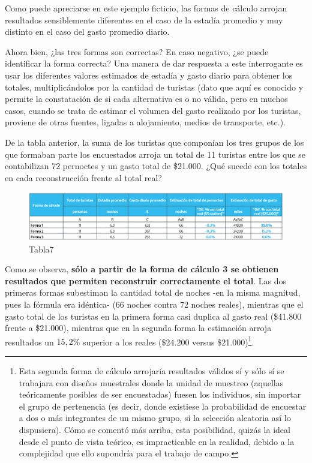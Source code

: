 \documentclass[
]{book}
\begin{document}
Como puede apreciarse en este ejemplo ficticio, las formas de cálculo arrojan resultados sensiblemente diferentes en el caso de la estadía promedio y muy distinto en el caso del gasto promedio diario.

Ahora bien, ¿las tres formas son correctas? En caso negativo, ¿se puede identificar la forma correcta? Una manera de dar respuesta a este interrogante es usar los diferentes valores estimados de estadía y gasto diario para obtener los totales, multiplicándolos por la cantidad de turistas (dato que aquí es conocido y permite la constatación de si cada alternativa es o no válida, pero en muchos casos, cuando se trata de estimar el volumen del gasto realizado por los turistas, proviene de otras fuentes, ligadas a alojamiento, medios de transporte, etc.).

De la tabla anterior, la suma de los turistas que componían los tres grupos de los que formaban parte los encuestados arroja un total de 11 turistas entre los que se contabilizan 72 pernoctes y un gasto total de \$21.000. ¿Qué sucede con los totales en cada reconstrucción frente al total real?

\begin{figure}
\includegraphics[width=1\linewidth]{imagenes/tabla_7} \caption{Tabla7}\label{fig:Totalreal}
\end{figure}

Como se observa, \textbf{sólo a partir de la forma de cálculo 3 se obtienen resultados que permiten reconstruir correctamente el total}. Las dos primeras formas subestiman la cantidad total de noches -en la misma magnitud, pues la fórmula era idéntica- (66 noches contra 72 noches reales), mientras que el gasto total de los turistas en la primera forma casi duplica al gasto real (\$41.800 frente a \$21.000), mientras que en la segunda forma la estimación arroja resultados un \(15,2\%\) superior a los reales (\$24.200 versus \$21.000)\footnote{Esta segunda forma de cálculo arrojaría resultados válidos sí y sólo sí se trabajara con diseños muestrales donde la unidad de muestreo (aquellas teóricamente posibles de ser encuestadas) fuesen los individuos, sin importar el grupo de pertenencia (es decir, donde existiese la probabilidad de encuestar a dos o más integrantes de un mismo grupo, si la selección aleatoria así lo dispusiera). Cómo se comentó más arriba, esta posibilidad, quizás la ideal desde el punto de vista teórico, es impracticable en la realidad, debido a la complejidad que ello supondría para el trabajo de campo.}.
\end{document}
